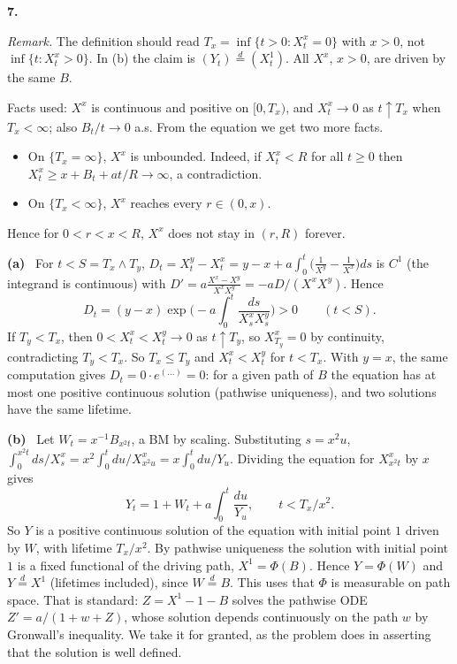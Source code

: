 \documentclass[11pt,a4paper]{article}
\newcommand{\1}{\mathbf{1}}
\newcommand{\prob}[1]{\par\medskip\noindent\textbf{#1}\quad}
\newcommand{\sub}[1]{\par\smallskip\noindent\textbf{#1}\ }
\newcommand{\note}[1]{\par\noindent\emph{Remark.} #1}
\begin{document}
\prob{7.}
\note{The definition should read $T_x=\inf\{t>0:X^x_t=0\}$ with $x>0$, not $\inf\{t:X^x_t>0\}$. In (b) the claim is
$(Y_t)\overset d=(X^1_t)$. All $X^x$, $x>0$, are driven by the same $B$.}

Facts used: $X^x$ is continuous and positive on $[0,T_x)$, and $X^x_t\to0$ as $t\uparrow T_x$ when $T_x<\infty$; also
$B_t/t\to0$ a.s. From the equation we get two more facts.
\begin{itemize}[leftmargin=*,nosep]
\item On $\{T_x=\infty\}$, $X^x$ is unbounded. Indeed, if $X^x_t<R$ for all $t\ge0$ then
$X^x_t\ge x+B_t+at/R\to\infty$, a contradiction.
\item On $\{T_x<\infty\}$, $X^x$ reaches every $r\in(0,x)$.
\end{itemize}
Hence for $0<r<x<R$, $X^x$ does not stay in $(r,R)$ forever.

\sub{(a)} For $t<S=T_x\wedge T_y$, $D_t=X^y_t-X^x_t=y-x+a\int_0^t\big(\frac1{X^y}-\frac1{X^x}\big)ds$ is $C^1$ (the
integrand is continuous) with $D'=a\frac{X^x-X^y}{X^xX^y}=-aD/(X^xX^y)$. Hence
\[D_t=(y-x)\exp\Big(-a\int_0^t\frac{ds}{X^x_sX^y_s}\Big)>0\qquad(t<S).\]
If $T_y<T_x$, then $0<X^x_t<X^y_t\to0$ as $t\uparrow T_y$, so $X^x_{T_y}=0$ by continuity, contradicting $T_y<T_x$.
So $T_x\le T_y$ and $X^x_t<X^y_t$ for $t<T_x$. With $y=x$, the same computation gives $D_t=0\cdot e^{(\dots)}=0$: for
a given path of $B$ the equation has at most one positive continuous solution (pathwise uniqueness), and two solutions
have the same lifetime.

\sub{(b)} Let $W_t=x^{-1}B_{x^2t}$, a BM by scaling. Substituting $s=x^2u$,
$\int_0^{x^2t}ds/X^x_s=x^2\int_0^tdu/X^x_{x^2u}=x\int_0^tdu/Y_u$. Dividing the equation for $X^x_{x^2t}$ by $x$ gives
\[
Y_t=1+W_t+a\int_0^t\frac{du}{Y_u},\qquad t<T_x/x^2 .
\]
So $Y$ is a positive continuous solution of the equation with initial point $1$ driven by $W$, with lifetime
$T_x/x^2$. By pathwise uniqueness the solution with initial point $1$ is a fixed functional of the driving path,
$X^1=\Phi(B)$. Hence $Y=\Phi(W)$ and $Y\overset d=X^1$ (lifetimes included), since $W\overset d=B$. This uses that
$\Phi$ is measurable on path space. That is standard: $Z=X^1-1-B$ solves the pathwise ODE $Z'=a/(1+w+Z)$, whose
solution depends continuously on the path $w$ by Gronwall's inequality. We take it for granted, as the problem does
in asserting that the solution is well defined.
\end{document}

